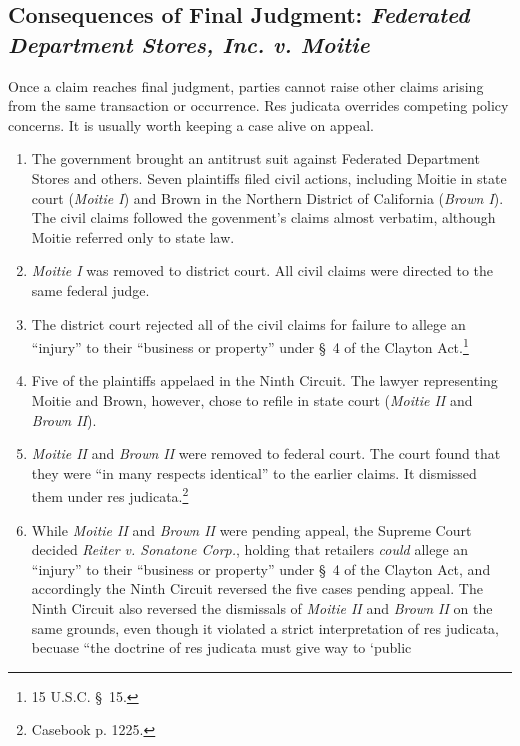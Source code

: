\subsection{Consequences of Final Judgment: \emph{Federated Department Stores, 
Inc. v. Moitie}}

Once a claim reaches final judgment, parties cannot raise other claims arising 
from the same transaction or occurrence. Res judicata overrides competing 
policy concerns. It is usually worth keeping a case alive on appeal.

\begin{enumerate}
    \item The government brought an antitrust suit against Federated 
    Department Stores and others. Seven plaintiffs filed civil actions, 
    including Moitie in state court (\emph{Moitie I}) and Brown in the 
    Northern District of California (\emph{Brown I}). The civil claims 
    followed the govenment's claims almost verbatim, although Moitie referred 
    only to state law.
    \item \emph{Moitie I} was removed to district court. All civil claims were 
    directed to the same federal judge.
    \item The district court rejected all of the civil claims for failure to 
    allege an ``injury'' to their ``business or property'' under \S\ 4 of the 
    Clayton Act.\footnote{15 U.S.C. \S\ 15.}
    \item Five of the plaintiffs appelaed in the Ninth Circuit. The lawyer 
    representing Moitie and Brown, however, chose to refile in state court 
    (\emph{Moitie II} and \emph{Brown II}).
    \item \emph{Moitie II} and \emph{Brown II} were removed to federal court.  
    The court found that they were ``in many respects identical'' to the 
    earlier claims. It dismissed them under res judicata.\footnote{Casebook p.  
    1225.}
    \item While \emph{Moitie II} and \emph{Brown II} were pending appeal, the 
    Supreme Court decided \emph{Reiter v. Sonatone Corp.}, holding that 
    retailers \emph{could} allege an ``injury'' to their ``business or 
    property'' under \S\ 4 of the Clayton Act, and accordingly the Ninth 
    Circuit reversed the five cases pending appeal. The Ninth Circuit also 
    reversed the dismissals of \emph{Moitie II} and \emph{Brown II} on the 
    same grounds, even though it violated a strict interpretation of res 
    judicata, becuase ``the doctrine of res judicata must give way to `public 

\end{enumerate}
